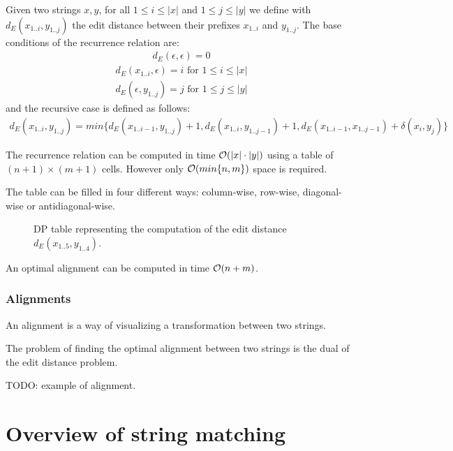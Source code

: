 Given two strings $x,y$, for all $1 \leq i \leq | x |$ and $1 \leq j \leq | y |$ we define with $d_E(x_{1..i},y_{1..j})$ the edit distance between their prefixes $x_{1..i}$ and $y_{1..j}$.
The base conditions of the recurrence relation are:
\begin{eqnarray}
d_E(\epsilon,\epsilon) = 0
\end{eqnarray}
\begin{eqnarray}
d_E(x_{1..i},\epsilon) = i \text{ for } 1 \leq i \leq | x |
\end{eqnarray}
\begin{eqnarray}
d_E(\epsilon, y_{1..j}) = j \text{ for } 1 \leq j \leq | y |
\end{eqnarray}
and the recursive case is defined as follows:
\begin{eqnarray}
d_E(x_{1..i},y_{1..j}) = min \{ d_E(x_{1..i-1},y_{1..j})+1, d_E(x_{1..i},y_{1..j-1})+1, d_E(x_{1..i-1},x_{1..j-1}) + \delta(x_i, y_j)\}
\end{eqnarray}

The recurrence relation can be computed in time $\mathcal{O}(| x | \cdot | y |)$ using a table of $(n+1) \times (m+1)$ cells. However only $\mathcal{O}(min\{ n, m \})$ space is required.

The table can be filled in four different ways: column-wise, row-wise, diagonal-wise or antidiagonal-wise.

\begin{figure}[h]
\caption{DP table representing the computation of the edit distance $d_E(x_{1..5}, y_{1..4})$.}
\label{fig:edit-dp}
\end{figure}

An optimal alignment can be computed in time $\mathcal{O}(n + m)$.

\subsubsection{Alignments}

An alignment is a way of visualizing a transformation between two strings.

The problem of finding the optimal alignment between two strings is the dual of the edit distance problem.

\begin{example}
TODO: example of alignment.
\end{example}


\section{Overview of string matching}

